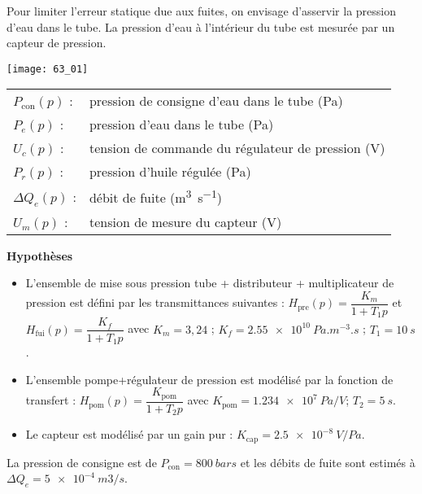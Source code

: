 \normalfalse \difficiletrue \tdifficilefalse
\correctiontrue

\setcounter{question}{0}%

\ifcorrection
\else
{}
\fi

\ifprof
\else

Pour limiter l’erreur statique due aux fuites, on envisage d’asservir la pression d’eau dans le tube. 
La pression d’eau à l’intérieur du tube est mesurée par un capteur de pression. 

\begin{marginfigure}
\texttt{[image: 63\_01]}
\end{marginfigure}

 
 \begin{tabular}{lp{5cm}}
$P_{\text{con}}(p)$ : & 	pression de consigne d’eau dans le tube (Pa) \\
$P_e(p)$ : & 	pression d’eau dans le tube (Pa) \\
$U_c(p)$ : & 	tension de commande du régulateur de pression (V)\\
$P_r(p)$ : &	pression d’huile régulée (Pa)\\
$\Delta Q_e(p)$ :& 	débit de fuite (\si{m^3s^{-1}})\\
$U_m(p)$ 	:&	tension de mesure du capteur (V)\\
\end{tabular}
 
\textbf{ Hypothèses}
\begin{itemize}
\item L’ensemble de mise sous pression {tube + distributeur + multiplicateur de pression} est défini par les transmittances suivantes : $H_{\text{pre}} (p)=\dfrac{K_m}{1+T_1 p}$	et	$H_{\text{fui}} (p)=\dfrac{K_f}{1+T_1 p}$ avec 	$K_m = 3,24$ ; 	$K_f = \SI{2,55e10}{Pa.m^{-3}.s}$ ; 	$T_1  = \SI{10}{s}$.
\item L’ensemble {pompe+régulateur de pression} est modélisé par la fonction de transfert :
$H_{\text{pom}} (p)=\dfrac{K_{\text{pom}}}{1+T_2 p}$  avec 	$K_{\text{pom}} = \SI{1,234e7}{Pa/V}$; 	$T_2 = \SI{5}{s}$.
\item Le capteur est modélisé par un gain pur :	$K_{\text{cap}} = \SI{2,5e-8}{V/Pa}$.
\end{itemize}
La pression de consigne est de $P_{\text{con}} = \SI{800}{bars}$ et les débits de fuite sont estimés à $\Delta Q_e = \SI{5e-4}{m3/s}$.

